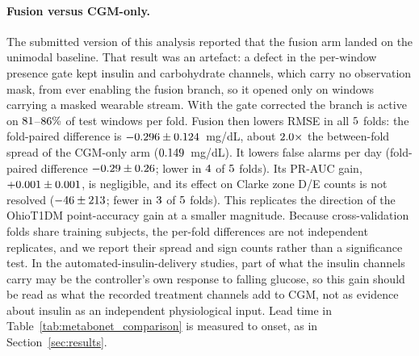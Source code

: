 \paragraph{Fusion versus CGM-only.} The submitted version of this analysis
reported that the fusion arm landed on the unimodal baseline. That result was an
artefact: a defect in the per-window presence gate kept insulin and
carbohydrate channels, which carry no observation mask, from ever enabling the
fusion branch, so it opened only on windows carrying a masked wearable stream. With the gate corrected the
branch is active on $81$--$86\%$
of test windows per fold. Fusion then lowers RMSE in all
$5$ folds: the fold-paired difference is
$-0.296 \pm 0.124$~mg/dL, about
$2.0\times$ the between-fold spread of the CGM-only
arm ($0.149$~mg/dL). It lowers false alarms per day (fold-paired
difference $-0.29 \pm 0.26$; lower in
$4$ of $5$ folds). Its PR-AUC gain,
$+0.001 \pm 0.001$, is negligible, and
its effect on Clarke zone D/E counts is not resolved
($-46 \pm 213$; fewer in
$3$ of $5$ folds). This replicates the
direction of the OhioT1DM point-accuracy gain at a smaller magnitude. Because
cross-validation folds share training subjects, the per-fold differences are not
independent replicates, and we report their spread and sign counts rather than a
significance test. In the automated-insulin-delivery studies, part of what the
insulin channels carry may be the controller's own response to falling glucose,
so this gain should be read as what the recorded treatment channels add to CGM,
not as evidence about insulin as an independent physiological input. Lead
time in Table~\ref{tab:metabonet_comparison} is measured to onset, as in
Section~\ref{sec:results}.

